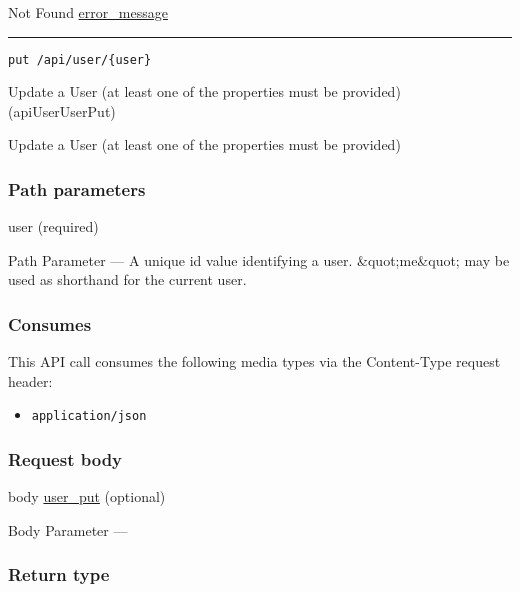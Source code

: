 Not Found \protect\hyperlink{error_message}{error\_message}

\begin{center}\rule{0.5\linewidth}{\linethickness}\end{center}

\protect\hypertarget{apiUserUserPut}{}{}

\begin{verbatim}
put /api/user/{user}
\end{verbatim}

Update a User (at least one of the properties must be provided)
({apiUserUserPut})

Update a User (at least one of the properties must be provided)

\hypertarget{path-parameters-69}{%
\subsubsection{Path parameters}\label{path-parameters-69}}

user (required)

{Path Parameter} --- A unique id value identifying a user.
\&quot;me\&quot; may be used as shorthand for the current user.

\hypertarget{consumes-41}{%
\subsubsection{Consumes}\label{consumes-41}}

This API call consumes the following media types via the {Content-Type}
request header:

\begin{itemize}
\tightlist
\item
  \texttt{application/json}
\end{itemize}

\hypertarget{request-body-41}{%
\subsubsection{Request body}\label{request-body-41}}

body \protect\hyperlink{user_put}{user\_put} (optional)

{Body Parameter} ---

\hypertarget{return-type-99}{%
\subsubsection{Return type}\label{return-type-99}}

